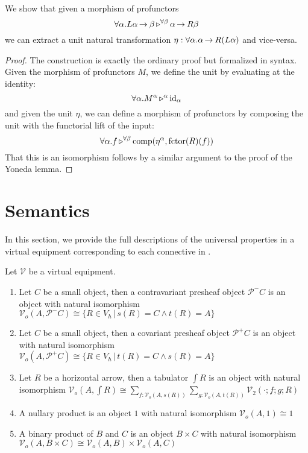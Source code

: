 \documentclass{llncs}
\begin{document}
\begin{lemma}
  We show that given a morphism of profunctors
  \[ \forall \alpha. L\alpha \mathop{\to_{}} \beta \mathop{\triangleright^{\forall \beta}} \alpha \mathop{\to_{}} R \beta\]
  we can extract a unit natural transformation $\eta : \forall \alpha. \alpha \mathop{\to_{}} R(L\alpha)$ and vice-versa.
\end{lemma}
\begin{proof}
  The construction is exactly the ordinary proof but formalized in \vett{} syntax.
  Given the morphism of profunctors $M$, we define the unit by evaluating at the identity:
  \[ \forall \alpha. M^{\alpha} \mathop{\triangleright^{\alpha}} \textrm{id}_{\alpha} \]
  and given the unit $\eta$, we can define a morphism of profunctors
  by composing the unit with the functorial lift of the input:
  \[ \forall \alpha. f \mathop{\triangleright^{\forall \beta}} \textrm{comp}(\eta^{\alpha}, \textrm{fctor}(R)(f))\]
  That this is an isomorphism follows by a similar argument to the
  proof of the Yoneda lemma.
\end{proof}

\section{Semantics}
\label{sec:appendix:semantics}

In this section, we provide the full descriptions of the universal
properties in a virtual equipment corresponding to each connective in
\vett{}.

\begin{definition}
  Let $\mathcal V$ be a virtual equipment.
  \begin{enumerate}
  \item Let $C$ be a small object, then a contravariant presheaf object $\mathcal P^- C$ is an object with natural isomorphism
    $\mathcal V_o(A, \mathcal P^- C) \cong \{ R \in V_h \,|\, s(R) = C \wedge t(R) = A \}$
  \item Let $C$ be a small object, then a covariant presheaf object $\mathcal P^+ C$ is an object with natural isomorphism
    $\mathcal V_o(A, \mathcal P^+ C) \cong \{ R \in V_h \,|\, t(R) = C \wedge s(R) = A \}$
  \item Let $R$ be a horizontal arrow, then a tabulator $\int R$ is an object with natural isomorphism
    $\mathcal V_o(A, \int R) \cong \sum_{f : {\mathcal V}_o(A, s(R))}\sum_{g : {\mathcal V}_o(A, t(R))}{\mathcal V}_2(\cdot;f;g;R)$
  \item A nullary product is an object $1$ with natural isomorphism $\mathcal V_o(A,1) \cong 1$
  \item A binary product of $B$ and $C$ is an object $B \times C$ with natural isomorphism $\mathcal V_o(A,B \times C) \cong {\mathcal V}_o(A,B)  \times {\mathcal V}_o(A,C) $
  \end{enumerate}
\end{definition}
\end{document}
